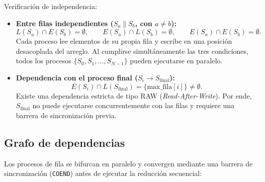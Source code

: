 Verificaci\'on de independencia:
\begin{itemize}[leftmargin=1.4cm]
    \item \textbf{Entre filas independientes ($S_a \parallel S_b$, con $a \neq b$):}
    \[
        L(S_a) \cap E(S_b) = \emptyset, \qquad
        E(S_a) \cap L(S_b) = \emptyset, \qquad
        E(S_a) \cap E(S_b) = \emptyset.
    \]
    Cada proceso lee elementos de su propia fila y escribe en una posici\'on
    desacoplada del arreglo. Al cumplirse simult\'aneamente las tres
    condiciones, todos los procesos $\{S_0, S_1, \dots, S_{N-1}\}$ pueden
    ejecutarse en paralelo.
    \item \textbf{Dependencia con el proceso final ($S_i \rightarrow S_{\text{final}}$):}
    \[
        E(S_i) \cap L(S_{\text{final}}) = \{ \text{max\_fila}[i] \} \neq \emptyset.
    \]
    Existe una dependencia estricta de tipo RAW (\emph{Read-After-Write}). Por
    ende, $S_{\text{final}}$ no puede ejecutarse concurrentemente con las filas
    y requiere una barrera de sincronizaci\'on previa.
\end{itemize}

\subsection*{Grafo de dependencias}
Los procesos de fila se bifurcan en paralelo y convergen mediante una barrera
de sincronizaci\'on (\texttt{COEND}) antes de ejecutar la reducci\'on secuencial:

\begin{center}
\end{center}

